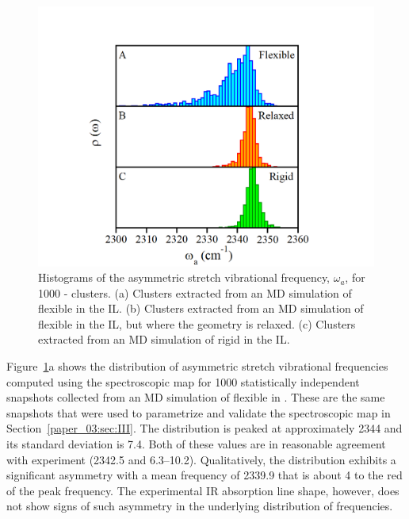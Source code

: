 \documentclass[%
  class = book,%
  crop = false,%
  float = true,%
  multi = true,%
  preview = false,%
]{standalone}
\begin{document}
\begin{figure}
  \centering
  \includegraphics[width=\textwidth]{figure5.png}
  \caption[Histograms of  \(\tilde{\nu}_{3}\) from MD simulations]{Histograms of the  asymmetric stretch vibrational frequency, \(\omega_{a}\), for \num{1000} -\ce{[C4C1im][PF6]} clusters. (a) Clusters extracted from an MD simulation of flexible  in the \ce{[C4C1im][PF6]} IL. (b) Clusters extracted from an MD simulation of flexible  in the \ce{[C4C1im][PF6]} IL, but where the  geometry is relaxed. (c) Clusters extracted from an MD simulation of rigid  in the \ce{[C4C1im][PF6]} IL.}
  \label{paper_03:fig5}
\end{figure}

Figure~\ref{paper_03:fig5}a shows the distribution of  asymmetric stretch vibrational frequencies computed using the spectroscopic map for \num{1000} statistically independent snapshots collected from an MD simulation of flexible  in \ce{[C4C1im][PF6]}. These are the same snapshots that were used to parametrize and validate the spectroscopic map in Section~\ref{paper_03:sec:III}. The distribution is peaked at approximately \SI{2344}{\wavenumber} and its standard deviation is \SI{7.4}{\wavenumber}. Both of these values are in reasonable agreement with experiment (\SI{2342.5}{\wavenumber} and \SIrange{6.3}{10.2}{\wavenumber}). Qualitatively, the distribution exhibits a significant asymmetry with a mean frequency of \SI{2339.9}{\wavenumber} that is about \SI{4}{\wavenumber} to the red of the peak frequency. The experimental IR absorption line shape, however, does not show signs of such asymmetry in the underlying distribution of frequencies.
\end{document}
